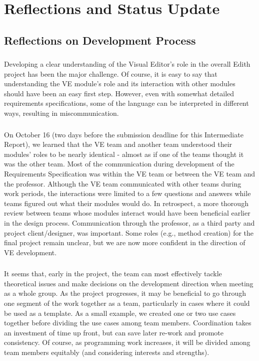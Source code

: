 \documentclass{llncs}
\begin{document}
\section{Reflections and Status Update}

\subsection{Reflections on Development Process}
\subsubsection{}
Developing a clear understanding of the Visual Editor’s role in the overall Edith project has been the major challenge.   Of course, it is easy to say that understanding the VE module’s role and its interaction with other modules should have been an easy first step.  However, even with somewhat detailed requirements specifications, some of the language can be interpreted in different ways, resulting in miscommunication.  

\subsubsection{}
On October 16 (two days before the submission deadline for this Intermediate Report), we learned that the VE team and another team understood their modules’ roles to be nearly identical - almost as if one of the teams thought it was the other team.  Most of the communication during development of the Requirements Specification was within the VE team or between the VE team and the professor.  Although the VE team communicated with other teams during work periods, the interactions were limited to a few questions and answers while teams figured out what their modules would do.  In retrospect, a more thorough review between teams whose modules interact would have been beneficial earlier in the design process.  Communication through the professor, as a third party and project client/designer, was important.  Some roles (e.g., method creation) for the final project remain unclear, but we are now more confident in the direction of VE development.  

\subsubsection{}
It seems that, early in the project, the team can most effectively tackle theoretical issues and make decisions on the development direction when meeting as a whole group.  As the project progresses, it may be beneficial to go through one segment of the work together as a team, particularly in cases where it could be used as a template.  As a small example, we created one or two use cases together before dividing the use cases among team members.  Coordination takes an investment of time up front, but can save later re-work and promote consistency.  Of course, as programming work increases, it will be divided among team members equitably (and considering interests and strengths).  
\end{document}
